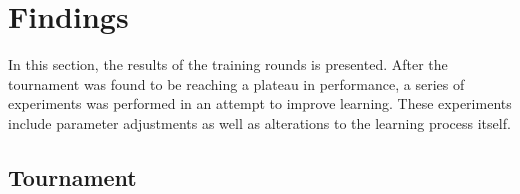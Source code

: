 \section{Findings}
\label{sec:findings}

In this section,
the results of the training rounds is presented.
%
After the tournament was found to be reaching a plateau in performance,
a series of experiments was performed in an attempt to improve learning.
%
These experiments include parameter adjustments as well as alterations to the
learning process itself.


\subsection{Tournament}






%
